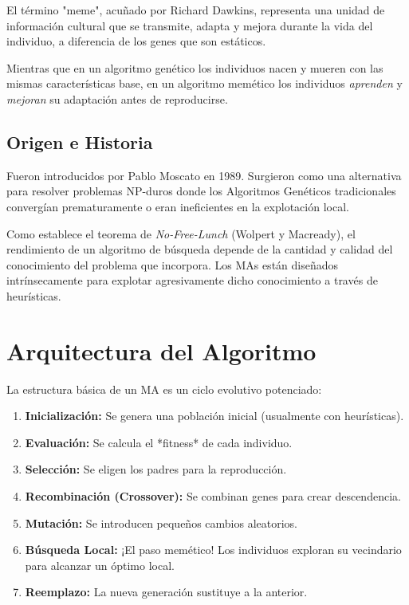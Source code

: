 \documentclass[notumble,10pt]{leaflet}
\begin{document}
El término "meme", acuñado por Richard Dawkins, representa una unidad de información cultural que se transmite, adapta y mejora durante la vida del individuo, a diferencia de los genes que son estáticos.

\begin{tcolorbox}[mybox, title=\textbf{!} El Concepto Clave]
Mientras que en un algoritmo genético los individuos nacen y mueren con las mismas características base, en un algoritmo memético los individuos \textit{aprenden} y \textit{mejoran} su adaptación antes de reproducirse.
\end{tcolorbox}

\subsection{Origen e Historia}
Fueron introducidos por Pablo Moscato en 1989. Surgieron como una alternativa para resolver problemas NP-duros donde los Algoritmos Genéticos tradicionales convergían prematuramente o eran ineficientes en la explotación local.

\begin{tcolorbox}[mybox, title=\textbf{*} Conocimiento del Problema]
Como establece el teorema de \textit{No-Free-Lunch} (Wolpert y Macready), el rendimiento de un algoritmo de búsqueda depende de la cantidad y calidad del conocimiento del problema que incorpora. Los MAs están diseñados intrínsecamente para explotar agresivamente dicho conocimiento a través de heurísticas.
\end{tcolorbox}

\newpage

\section{Arquitectura del Algoritmo}

La estructura básica de un MA es un ciclo evolutivo potenciado:

\begin{enumerate}[label=\textbf{\arabic*.}, leftmargin=*]
    \item \textbf{Inicialización:} Se genera una población inicial (usualmente con heurísticas).
    \item \textbf{Evaluación:} Se calcula el *fitness* de cada individuo.
    \item \textbf{Selección:} Se eligen los padres para la reproducción.
    \item \textbf{Recombinación (Crossover):} Se combinan genes para crear descendencia.
    \item \textbf{Mutación:} Se introducen pequeños cambios aleatorios.
    \item \textbf{\color{accent}Búsqueda Local:} ¡El paso memético! Los individuos exploran su vecindario para alcanzar un óptimo local.
    \item \textbf{Reemplazo:} La nueva generación sustituye a la anterior.
\end{enumerate}
\end{document}
